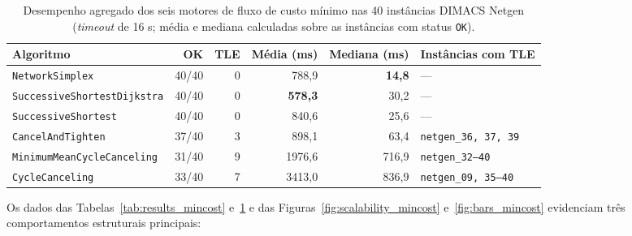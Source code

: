 \begin{table}[!ht]
\centering
\small
\setlength{\tabcolsep}{4.5pt}
\begin{tabular}{lrrrrl}
\toprule
\textbf{Algoritmo} & \textbf{OK} & \textbf{TLE} & \textbf{Média (ms)} & \textbf{Mediana (ms)} & \textbf{Instâncias com TLE} \\
\midrule
\lstinline{NetworkSimplex} & 40/40 & 0 & 788,9 & \textbf{14,8} & --- \\
\lstinline{SuccessiveShortestDijkstra} & 40/40 & 0 & \textbf{578,3} & 30,2 & --- \\
\lstinline{SuccessiveShortest} & 40/40 & 0 & 840,6 & 25,6 & --- \\
\lstinline{CancelAndTighten} & 37/40 & 3 & 898,1 & 63,4 & \texttt{netgen\_36, 37, 39} \\
\lstinline{MinimumMeanCycleCanceling} & 31/40 & 9 & 1976,6 & 716,9 & \texttt{netgen\_32--40} \\
\lstinline{CycleCanceling} & 33/40 & 7 & 3413,0 & 836,9 & \texttt{netgen\_09, 35--40} \\
\bottomrule
\end{tabular}
\caption{Desempenho agregado dos seis motores de fluxo de custo mínimo nas 40 instâncias DIMACS Netgen (\textit{timeout} de 16 s; média e mediana calculadas sobre as instâncias com status \texttt{OK}).}
\label{tab:summary_mincost}
\end{table}

Os dados das Tabelas~\ref{tab:results_mincost} e~\ref{tab:summary_mincost} e das Figuras~\ref{fig:scalability_mincost} e~\ref{fig:bars_mincost} evidenciam três comportamentos estruturais principais:

